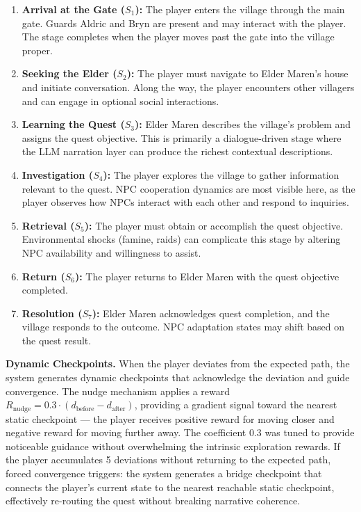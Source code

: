 \documentclass[12pt, a4paper, oneside]{report}
\begin{document}
\begin{enumerate}[nosep]
    \item \textbf{Arrival at the Gate ($S_1$):} The player enters the village through the main gate. Guards Aldric and Bryn are present and may interact with the player. The stage completes when the player moves past the gate into the village proper.
    \item \textbf{Seeking the Elder ($S_2$):} The player must navigate to Elder Maren's house and initiate conversation. Along the way, the player encounters other villagers and can engage in optional social interactions.
    \item \textbf{Learning the Quest ($S_3$):} Elder Maren describes the village's problem and assigns the quest objective. This is primarily a dialogue-driven stage where the LLM narration layer can produce the richest contextual descriptions.
    \item \textbf{Investigation ($S_4$):} The player explores the village to gather information relevant to the quest. NPC cooperation dynamics are most visible here, as the player observes how NPCs interact with each other and respond to inquiries.
    \item \textbf{Retrieval ($S_5$):} The player must obtain or accomplish the quest objective. Environmental shocks (famine, raids) can complicate this stage by altering NPC availability and willingness to assist.
    \item \textbf{Return ($S_6$):} The player returns to Elder Maren with the quest objective completed.
    \item \textbf{Resolution ($S_7$):} Elder Maren acknowledges quest completion, and the village responds to the outcome. NPC adaptation states may shift based on the quest result.
\end{enumerate}

\textbf{Dynamic Checkpoints.} When the player deviates from the expected path, the system generates dynamic checkpoints that acknowledge the deviation and guide convergence. The nudge mechanism applies a reward $R_{\text{nudge}} = 0.3 \cdot (d_{\text{before}} - d_{\text{after}})$, providing a gradient signal toward the nearest static checkpoint --- the player receives positive reward for moving closer and negative reward for moving further away. The coefficient 0.3 was tuned to provide noticeable guidance without overwhelming the intrinsic exploration rewards. If the player accumulates 5 deviations without returning to the expected path, forced convergence triggers: the system generates a bridge checkpoint that connects the player's current state to the nearest reachable static checkpoint, effectively re-routing the quest without breaking narrative coherence.
\end{document}

